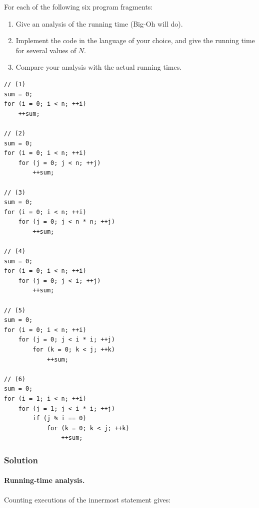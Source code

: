 \documentclass[12pt,a4paper]{article}
\begin{document}
\noindent
For each of the following six program fragments:

\begin{enumerate}
  \renewcommand{\labelenumi}{\alph{enumi}.}
  \item Give an analysis of the running time (Big-Oh will do).
  \item Implement the code in the language of your choice, and give the
  running time for several values of $N$.
  \item Compare your analysis with the actual running times.
\end{enumerate}

\begin{lstlisting}
// (1)
sum = 0;
for (i = 0; i < n; ++i)
    ++sum;

// (2)
sum = 0;
for (i = 0; i < n; ++i)
    for (j = 0; j < n; ++j)
        ++sum;

// (3)
sum = 0;
for (i = 0; i < n; ++i)
    for (j = 0; j < n * n; ++j)
        ++sum;

// (4)
sum = 0;
for (i = 0; i < n; ++i)
    for (j = 0; j < i; ++j)
        ++sum;

// (5)
sum = 0;
for (i = 0; i < n; ++i)
    for (j = 0; j < i * i; ++j)
        for (k = 0; k < j; ++k)
            ++sum;

// (6)
sum = 0;
for (i = 1; i < n; ++i)
    for (j = 1; j < i * i; ++j)
        if (j % i == 0)
            for (k = 0; k < j; ++k)
                ++sum;
\end{lstlisting}

\subsubsection*{\color{sectionnavy}Solution}

\paragraph{Running-time analysis.}
Counting executions of the innermost statement gives:
\end{document}
